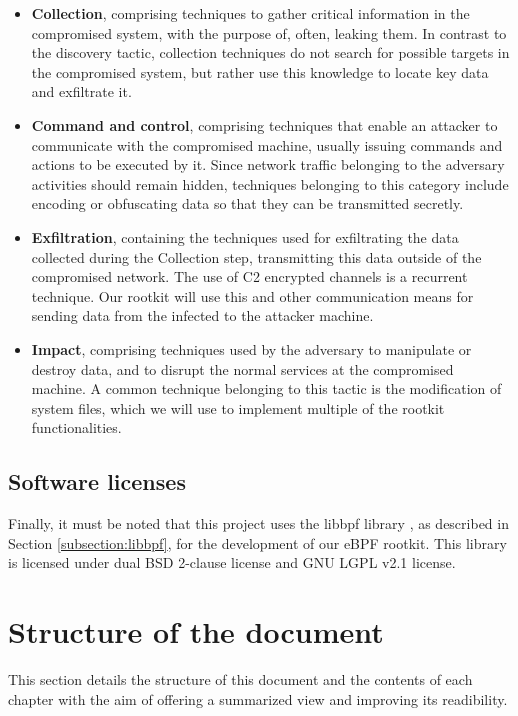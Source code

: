 \begin{itemize}
\item \textbf{Collection}, comprising techniques to gather critical information in the compromised system, with the purpose of, often, leaking them. In contrast to the discovery tactic, collection techniques do not search for possible targets in the compromised system, but rather use this knowledge to locate key data and exfiltrate it.
\item \textbf{Command and control}, comprising techniques that enable an attacker to communicate with the compromised machine, usually issuing commands and actions to be executed by it. Since network traffic belonging to the adversary activities should remain hidden, techniques belonging to this category include encoding or obfuscating data so that they can be transmitted secretly.
\item \textbf{Exfiltration}, containing the techniques used for exfiltrating the data collected during the Collection step, transmitting this data outside of the compromised network. The use of C2 encrypted channels is a recurrent technique. Our rootkit will use this and other communication means for sending data from the infected to the attacker machine.
\item \textbf{Impact}, comprising techniques used by the adversary to manipulate or destroy data, and to disrupt the normal services at the compromised machine. A common technique belonging to this tactic is the modification of system files, which we will use to implement multiple of the rootkit functionalities.
\end{itemize}

\subsection{Software licenses}
Finally, it must be noted that this project uses the libbpf library
\cite{libbpf_github}, as described in Section \ref{subsection:libbpf}, for
the development of our eBPF rootkit. This library is licensed under dual
BSD 2-clause license and GNU LGPL v2.1 license. 


\section{Structure of the document}
This section details the structure of this document and the contents of each chapter with the aim of offering a summarized view and improving its readibility.

